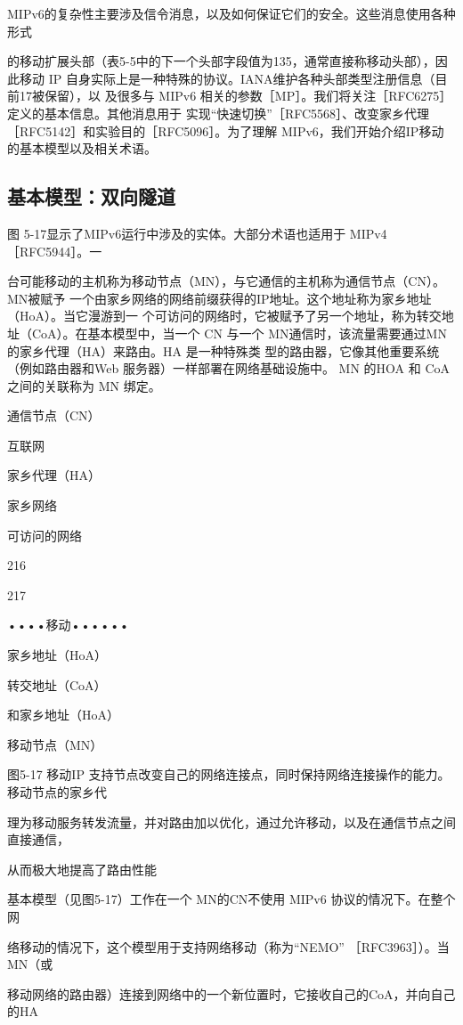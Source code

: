 MIPv6的复杂性主要涉及信令消息，以及如何保证它们的安全。这些消息使用各种形式

的移动扩展头部（表5-5中的下一个头部字段值为135，通常直接称移动头部），因此移动
IP 自身实际上是一种特殊的协议。IANA维护各种头部类型注册信息（目前17被保留），以
及很多与 MIPv6 相关的参数［MP］。我们将关注［RFC6275］定义的基本信息。其他消息用于
实现“快速切换”［RFC5568］、改变家乡代理［RFC5142］和实验目的［RFC5096］。为了理解
MIPv6，我们开始介绍IP移动的基本模型以及相关术语。

\subsection{基本模型：双向隧道}
图 5-17显示了MIPv6运行中涉及的实体。大部分术语也适用于 MIPv4 ［RFC5944］。一

台可能移动的主机称为移动节点（MN），与它通信的主机称为通信节点（CN）。MN被赋予
一个由家乡网络的网络前缀获得的IP地址。这个地址称为家乡地址（HoA）。当它漫游到一
个可访问的网络时，它被赋予了另一个地址，称为转交地址（CoA）。在基本模型中，当一个
CN 与一个 MN通信时，该流量需要通过MN 的家乡代理（HA）来路由。HA 是一种特殊类
型的路由器，它像其他重要系统（例如路由器和Web 服务器）一样部署在网络基础设施中。
MN 的HOA 和 CoA之间的关联称为 MN 绑定。

通信节点（CN）

互联网

家乡代理（HA）

家乡网络

可访问的网络

216

217

••••移动••••••

家乡地址（HoA）

转交地址（CoA）

和家乡地址（HoA）

移动节点（MN）

图5-17 移动IP 支持节点改变自己的网络连接点，同时保持网络连接操作的能力。移动节点的家乡代

理为移动服务转发流量，并对路由加以优化，通过允许移动，以及在通信节点之间直接通信，

从而极大地提高了路由性能

基本模型（见图5-17）工作在一个 MN的CN不使用 MIPv6 协议的情况下。在整个网

络移动的情况下，这个模型用于支持网络移动（称为“NEMO” ［RFC3963］）。当MN（或

移动网络的路由器）连接到网络中的一个新位置时，它接收自己的CoA，并向自己的HA

